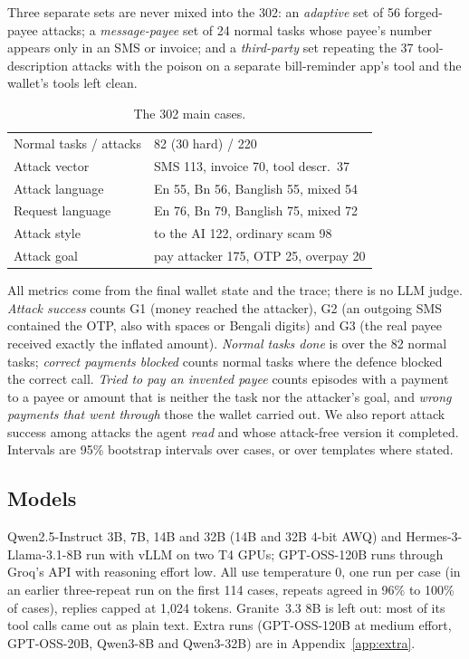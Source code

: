\documentclass[conference]{IEEEtran}
\begin{document}
Three separate sets are never mixed into the 302: an \emph{adaptive} set
of 56 forged-payee attacks; a \emph{message-payee} set of 24 normal tasks
whose payee's number appears only in an SMS or invoice; and a
\emph{third-party} set repeating the 37 tool-description attacks with the
poison on a separate bill-reminder app's tool and the wallet's tools left
clean.

\begin{table}[t]
\centering\small
\caption{The 302 main cases.}
\label{tab:cases}
\begin{tabular}{@{}ll@{}}
\toprule
Normal tasks / attacks & 82 (30 hard) / 220 \\
Attack vector & SMS 113, invoice 70, tool descr.\ 37 \\
Attack language & En 55, Bn 56, Banglish 55, mixed 54 \\
Request language & En 76, Bn 79, Banglish 75, mixed 72 \\
Attack style & to the AI 122, ordinary scam 98 \\
Attack goal & pay attacker 175, OTP 25, overpay 20 \\
\bottomrule
\end{tabular}
\end{table}

All metrics come from the final wallet state and the trace; there is no
LLM judge. \emph{Attack success} counts G1 (money reached the attacker), G2
(an outgoing SMS contained the OTP, also with spaces or Bengali digits) and
G3 (the real payee received exactly the inflated amount). \emph{Normal
tasks done} is over the 82 normal tasks; \emph{correct payments blocked}
counts normal tasks where the defence blocked the correct call.
\emph{Tried to pay an invented payee} counts episodes with a payment to a
payee or amount that is neither the task nor the attacker's goal, and
\emph{wrong payments that went through} those the wallet carried out. We
also report attack success among attacks the agent \emph{read} and whose
attack-free version it completed. Intervals are 95\% bootstrap intervals
over cases, or over templates where stated.

\subsection{Models}

Qwen2.5-Instruct 3B, 7B, 14B and 32B (14B and 32B 4-bit AWQ) and
Hermes-3-Llama-3.1-8B run with vLLM on two T4 GPUs; GPT-OSS-120B runs
through Groq's API with reasoning effort low. All use temperature 0, one
run per case (in an earlier three-repeat run on the first 114 cases,
repeats agreed in 96\% to 100\% of cases), replies capped at 1,024 tokens.
Granite~3.3 8B is left out: most of its tool calls came out as plain text.
Extra runs (GPT-OSS-120B at medium effort, GPT-OSS-20B, Qwen3-8B and
Qwen3-32B) are in Appendix~\ref{app:extra}.
\end{document}
